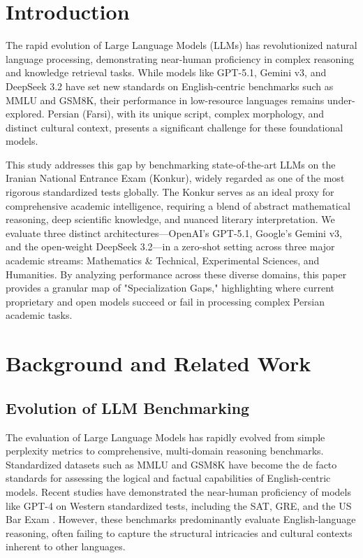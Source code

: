 \documentclass[twoside]{article}
\begin{document}
\section{Introduction}
The rapid evolution of Large Language Models (LLMs) has revolutionized natural language processing, demonstrating near-human proficiency in complex reasoning and knowledge retrieval tasks. While models like GPT-5.1, Gemini v3, and DeepSeek 3.2 have set new standards on English-centric benchmarks such as MMLU and GSM8K, their performance in low-resource languages remains under-explored. Persian (Farsi), with its unique script, complex morphology, and distinct cultural context, presents a significant challenge for these foundational models.

This study addresses this gap by benchmarking state-of-the-art LLMs on the Iranian National Entrance Exam (Konkur), widely regarded as one of the most rigorous standardized tests globally. The Konkur serves as an ideal proxy for comprehensive academic intelligence, requiring a blend of abstract mathematical reasoning, deep scientific knowledge, and nuanced literary interpretation. We evaluate three distinct architectures—OpenAI's GPT-5.1, Google's Gemini v3, and the open-weight DeepSeek 3.2—in a zero-shot setting across three major academic streams: Mathematics \& Technical, Experimental Sciences, and Humanities. By analyzing performance across these diverse domains, this paper provides a granular map of "Specialization Gaps," highlighting where current proprietary and open models succeed or fail in processing complex Persian academic tasks.

\section{Background and Related Work}

\subsection{Evolution of LLM Benchmarking}
The evaluation of Large Language Models has rapidly evolved from simple perplexity metrics to comprehensive, multi-domain reasoning benchmarks. Standardized datasets such as MMLU \cite{Hendrycks:2021} and GSM8K \cite{Cobbe:2021} have become the de facto standards for assessing the logical and factual capabilities of English-centric models. Recent studies have demonstrated the near-human proficiency of models like GPT-4 on Western standardized tests, including the SAT, GRE, and the US Bar Exam \cite{OpenAI:2023}. However, these benchmarks predominantly evaluate English-language reasoning, often failing to capture the structural intricacies and cultural contexts inherent to other languages.
\end{document}
